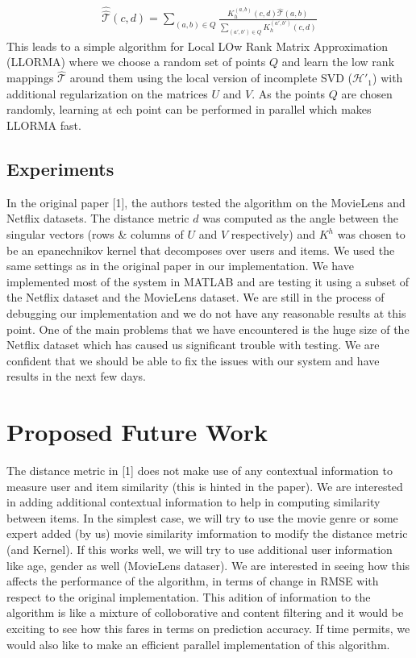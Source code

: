 \documentclass{article} %
\begin{document}
\begin{align}
\hat{\hat{\mathcal{T}}}(c,d) = \sum_{(a,b) \in Q} \frac{K_h^{(a,b)}(c,d) \hat{\mathcal{T}}(a,b)}{\sum_{(a',b') \in Q} K_h^{(a',b')}(c,d)}
\end{align}
This leads to a simple algorithm for Local LOw Rank Matrix Approximation (LLORMA) where we choose a random set of points $Q$ and learn the low rank mappings $\hat{\mathcal{T}}$ around them using the local version of incomplete SVD ($\mathcal{H'}_1$) with additional regularization on the matrices $U$ and $V$. As the points $Q$ are chosen randomly, learning at ech point can be performed in parallel which makes LLORMA fast.

\subsection{Experiments}
In the original paper [1], the authors tested the algorithm on the MovieLens and Netflix datasets. The distance metric $d$ was computed as the angle between the singular vectors (rows \& columns of $U$ and $V$ respectively) and $K^h$ was chosen to be an epanechnikov kernel that decomposes over users and items. We used the same settings as in the original paper in our implementation. We have implemented most of the system in MATLAB and are testing it using a subset of the Netflix dataset and the MovieLens dataset. We are still in the process of debugging our implementation and we do not have any reasonable results at this point. One of the main problems that we have encountered is the huge size of the Netflix dataset which has caused us significant trouble with testing. We are confident that we should be able to fix the issues with our system and have results in the next few days.

\section{Proposed Future Work}
The distance metric in [1] does not make use of any contextual information to measure user and item similarity (this is hinted in the paper). We are interested in adding additional contextual information to help in computing similarity between items. In the simplest case, we will try to use the movie genre or some expert added (by us) movie similarity imformation to modify the distance metric (and Kernel). If this works well, we will try to use additional user information like age, gender as well (MovieLens dataser).  We are interested in seeing how this affects the performance of the algorithm, in terms of change in RMSE with respect to the original implementation. This adition of information to the algorithm is like a mixture of colloborative and content filtering and it would be exciting to see how this fares in terms on prediction accuracy. If time permits, we would also like to make an efficient parallel implementation of this algorithm.
\end{document}
